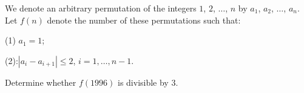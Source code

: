 We denote an arbitrary permutation of the integers $1$,  $2$,  $\ldots$,  $n$ by $a_1$,  $a_2$,  $\ldots$,  $a_n$.  Let $f(n)$ denote the number of these permutations such that:

(1) $a_1 = 1$;

(2):$|a_i - a_{i+1}| \leq 2$,  $i = 1, \ldots, n - 1$.

Determine whether $f(1996)$ is divisible by 3.